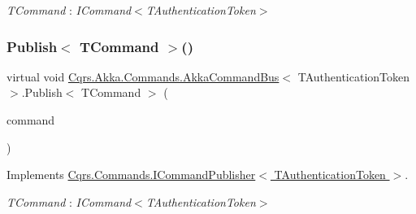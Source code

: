 \begin{Desc}
\item[Type Constraints]\begin{description}
\item[{\em T\+Command} : {\em I\+Command$<$T\+Authentication\+Token$>$}]\end{description}
\end{Desc}
\mbox{\label{classCqrs_1_1Akka_1_1Commands_1_1AkkaCommandBus_a48e1d46035b1e1a3251636b8a03f7dae_a48e1d46035b1e1a3251636b8a03f7dae}} 
\subsubsection{\texorpdfstring{Publish$<$ T\+Command $>$()}{Publish< TCommand >()}\hspace{0.1cm}{\footnotesize\ttfamily [1/2]}}
{\footnotesize\ttfamily virtual void \hyperlink{classCqrs_1_1Akka_1_1Commands_1_1AkkaCommandBus}{Cqrs.\+Akka.\+Commands.\+Akka\+Command\+Bus}$<$ T\+Authentication\+Token $>$.Publish$<$ T\+Command $>$ (\begin{DoxyParamCaption}\item[{T\+Command}]{command }\end{DoxyParamCaption})\hspace{0.3cm}{\ttfamily [virtual]}}



Implements \hyperlink{interfaceCqrs_1_1Commands_1_1ICommandPublisher_aeeb487ad5686d9c44d214b1daaf7833a_aeeb487ad5686d9c44d214b1daaf7833a}{Cqrs.\+Commands.\+I\+Command\+Publisher$<$ T\+Authentication\+Token $>$}.

\begin{Desc}
\item[Type Constraints]\begin{description}
\item[{\em T\+Command} : {\em I\+Command$<$T\+Authentication\+Token$>$}]\end{description}
\end{Desc}
\mbox{\label{classCqrs_1_1Akka_1_1Commands_1_1AkkaCommandBus_ab52365375febd74ac078e97af6e6cd24_ab52365375febd74ac078e97af6e6cd24}} 

